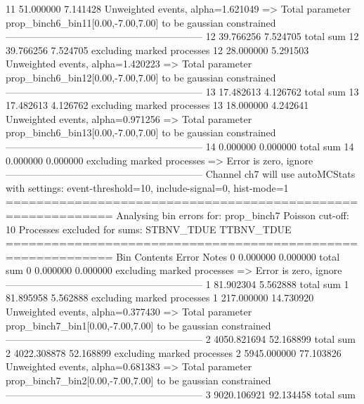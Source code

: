 11         51.000000       7.141428        Unweighted events, alpha=1.621049
  => Total parameter prop_binch6_bin11[0.00,-7.00,7.00] to be gaussian constrained
------------------------------------------------------------
12         39.766256       7.524705        total sum                     
12         39.766256       7.524705        excluding marked processes    
12         28.000000       5.291503        Unweighted events, alpha=1.420223
  => Total parameter prop_binch6_bin12[0.00,-7.00,7.00] to be gaussian constrained
------------------------------------------------------------
13         17.482613       4.126762        total sum                     
13         17.482613       4.126762        excluding marked processes    
13         18.000000       4.242641        Unweighted events, alpha=0.971256
  => Total parameter prop_binch6_bin13[0.00,-7.00,7.00] to be gaussian constrained
------------------------------------------------------------
14         0.000000        0.000000        total sum                     
14         0.000000        0.000000        excluding marked processes    
  => Error is zero, ignore      
------------------------------------------------------------
Channel ch7 will use autoMCStats with settings: event-threshold=10, include-signal=0, hist-mode=1
============================================================
Analysing bin errors for: prop_binch7
Poisson cut-off: 10
Processes excluded for sums: STBNV_TDUE TTBNV_TDUE
============================================================
Bin        Contents        Error           Notes                         
0          0.000000        0.000000        total sum                     
0          0.000000        0.000000        excluding marked processes    
  => Error is zero, ignore      
------------------------------------------------------------
1          81.902304       5.562888        total sum                     
1          81.895958       5.562888        excluding marked processes    
1          217.000000      14.730920       Unweighted events, alpha=0.377430
  => Total parameter prop_binch7_bin1[0.00,-7.00,7.00] to be gaussian constrained
------------------------------------------------------------
2          4050.821694     52.168899       total sum                     
2          4022.308878     52.168899       excluding marked processes    
2          5945.000000     77.103826       Unweighted events, alpha=0.681383
  => Total parameter prop_binch7_bin2[0.00,-7.00,7.00] to be gaussian constrained
------------------------------------------------------------
3          9020.106921     92.134458       total sum                     
